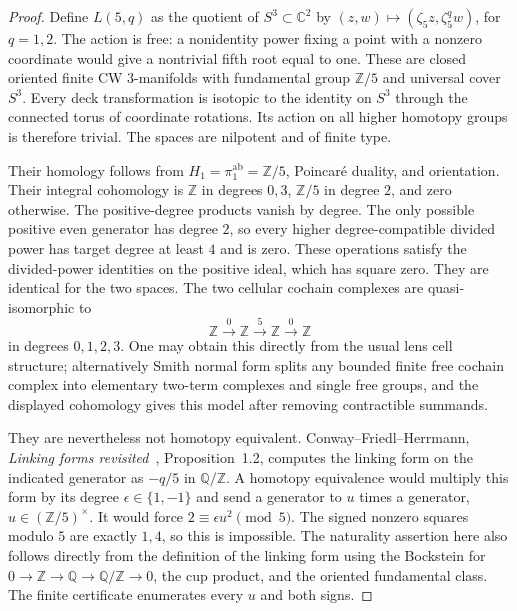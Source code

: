 \begin{proof}
Define $L(5,q)$ as the quotient of
$S^3\subset\mathbb C^2$ by
$(z,w)\mapsto(\zeta_5z,\zeta_5^qw)$, for $q=1,2$.
The action is free: a nonidentity power fixing a point with a nonzero
coordinate would give a nontrivial fifth root equal to one. These are
closed oriented finite CW $3$-manifolds with fundamental group
$\mathbb Z/5$ and universal cover $S^3$. Every deck transformation is
isotopic to the identity on $S^3$ through the connected torus of
coordinate rotations. Its action on all higher homotopy groups is
therefore trivial. The spaces are nilpotent and of finite type.

Their homology follows from $H_1=\pi_1^{\mathrm{ab}}=\mathbb Z/5$,
Poincar\'e duality, and orientation. Their integral cohomology is
$\mathbb Z$ in degrees $0,3$, $\mathbb Z/5$ in degree $2$, and zero
otherwise. The positive-degree products vanish by degree. The only
possible positive even generator has degree $2$, so every higher
degree-compatible divided power has target degree at least $4$ and is
zero. These operations satisfy the divided-power identities on the
positive ideal, which has square zero. They are identical for the two
spaces. The two cellular cochain complexes are quasi-isomorphic to
\[
 \mathbb Z\xrightarrow{0}\mathbb Z
 \xrightarrow{5}\mathbb Z\xrightarrow{0}\mathbb Z
\]
in degrees $0,1,2,3$. One may obtain this directly from the usual lens
cell structure; alternatively Smith normal form splits any bounded
finite free cochain complex into elementary two-term complexes and
single free groups, and the displayed cohomology gives this model
after removing contractible summands.

They are nevertheless not homotopy equivalent. Conway--Friedl--Herrmann,
\emph{Linking forms revisited}~\cite{CFH2016}, Proposition~1.2, computes the linking
form on the indicated generator as $-q/5$ in $\mathbb Q/\mathbb Z$.
A homotopy equivalence would multiply this form by its degree
$\epsilon\in\{1,-1\}$ and send a generator to $u$ times a generator,
$u\in(\mathbb Z/5)^\times$. It would force
$2\equiv\epsilon u^2\pmod5$. The signed nonzero squares modulo $5$
are exactly $1,4$, so this is impossible. The naturality assertion here
also follows directly from the definition of the linking form using
the Bockstein for $0\to\mathbb Z\to\mathbb Q\to\mathbb Q/\mathbb Z\to0$,
the cup product, and the oriented fundamental class. The finite
certificate enumerates every $u$ and both signs.
\end{proof}

